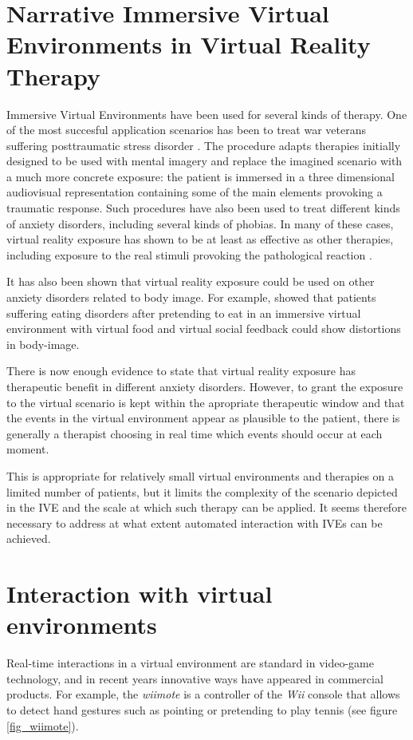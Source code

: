 \documentclass[
		twoside,openright,titlepage,numbers=noenddot,manychapters,
		headinclude,%
                footinclude=false,cleardoublepage=empty,
                BCOR=5mm,
		fontsize=11pt, %
                 enabledeprecatedfontcommands]{scrreprt}
\begin{document}
\section[Narrative IVE in Virtual Reality Therapy]{Narrative Immersive Virtual Environments in Virtual Reality Therapy}
\label{sec_therapy}

Immersive Virtual Environments have been used for several kinds of therapy.  One of the most succesful application scenarios has been to treat war veterans suffering posttraumatic stress disorder \cite[]{rizzo2011virtual}. The procedure adapts therapies initially designed to be used with mental imagery and replace the imagined scenario with a much more concrete exposure: the patient is immersed in a three dimensional audiovisual representation containing some of the main elements provoking a traumatic response. Such procedures have also been used to treat different kinds of anxiety disorders, including several kinds of phobias. In many of these cases, virtual reality exposure has shown to be at least as effective as other therapies, including exposure to the real stimuli provoking the pathological reaction \cite[]{gerardi2010virtual}. 

It has also been shown that virtual reality exposure could be used on other anxiety disorders related to body image. For example, \cite{gutierrez2010body} showed that patients suffering eating disorders  after pretending to eat in an immersive virtual environment with virtual food and virtual social feedback could show distortions in body-image.

There is now enough evidence to state that virtual reality exposure has therapeutic benefit in different anxiety disorders. However, to grant the exposure to the virtual scenario is kept within the apropriate therapeutic window and that the events in the virtual environment appear as plausible to the patient, there is generally a therapist choosing in real time which events should occur at each moment. 

This is appropriate for relatively small virtual environments and therapies on a limited number of patients, but it limits the complexity of the scenario depicted in the IVE and the scale at which such therapy can be applied. It seems therefore necessary to address at what extent automated interaction with IVEs can be achieved.



\section{Interaction with virtual environments}
\label{sec_interact}
Real-time interactions in a virtual environment are standard in video-game technology, and in recent years innovative ways have appeared in commercial products.  For example, the \emph{wiimote} is a controller of the \emph{Wii} console that allows to detect hand gestures such as pointing or pretending to  play tennis (see figure \ref{fig_wiimote}). 
\end{document}
